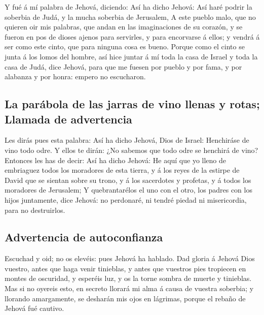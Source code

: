  Y fué á mí palabra de Jehová, diciendo:  Así ha
dicho Jehová: Así haré podrir la soberbia de Judá, y la mucha soberbia
de Jerusalem,  A este pueblo malo, que no quieren oir mis
palabras, que andan en las imaginaciones de su corazón, y se fueron en
pos de dioses ajenos para servirles, y para encorvarse á ellos; y vendrá
á ser como este cinto, que para ninguna cosa es bueno. 
Porque como el cinto se junta á los lomos del hombre, así hice juntar á
mí toda la casa de Israel y toda la casa de Judá, dice Jehová, para que
me fuesen por pueblo y por fama, y por alabanza y por honra: empero no
escucharon.

\hypertarget{la-paruxe1bola-de-las-jarras-de-vino-llenas-y-rotas-llamada-de-advertencia}{%
\subsection{La parábola de las jarras de vino llenas y rotas; Llamada de
advertencia}\label{la-paruxe1bola-de-las-jarras-de-vino-llenas-y-rotas-llamada-de-advertencia}}

 Les dirás pues esta palabra: Así ha dicho Jehová, Dios de
Israel: Henchiráse de vino todo odre. Y ellos te dirán: ¿No sabemos que
todo odre se henchirá de vino?  Entonces les has de decir:
Así ha dicho Jehová: He aquí que yo lleno de embriaguez todos los
moradores de esta tierra, y á los reyes de la estirpe de David que se
sientan sobre su trono, y á los sacerdotes y profetas, y á todos los
moradores de Jerusalem;  Y quebrantarélos el uno con el
otro, los padres con los hijos juntamente, dice Jehová: no perdonaré, ni
tendré piedad ni misericordia, para no destruirlos.

\hypertarget{advertencia-de-autoconfianza}{%
\subsection{Advertencia de
autoconfianza}\label{advertencia-de-autoconfianza}}

 Escuchad y oid; no os elevéis: pues Jehová ha hablado.
 Dad gloria á Jehová Dios vuestro, antes que haga venir
tinieblas, y antes que vuestros pies tropiecen en montes de oscuridad, y
esperéis luz, y os la torne sombra de muerte y tinieblas. 
Mas si no oyereis esto, en secreto llorará mi alma á causa de vuestra
soberbia; y llorando amargamente, se desharán mis ojos en lágrimas,
porque el rebaño de Jehová fué cautivo.

